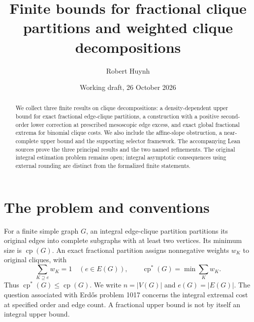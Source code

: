 \documentclass[11pt]{article}
\title{Finite bounds for fractional clique partitions and weighted clique decompositions}
\author{Robert Huynh}
\date{Working draft, 26 October 2026}
\newcommand{\cp}{\operatorname{cp}}
\begin{document}
\maketitle
\begin{abstract}
We collect three finite results on clique decompositions: a density-dependent upper bound for exact fractional edge-clique partitions, a construction with a positive second-order lower correction at prescribed mesoscopic edge excess, and exact global fractional extrema for binomial clique costs. We also include the affine-slope obstruction, a near-complete upper bound and the supporting selector framework. The accompanying Lean sources prove the three principal results and the two named refinements. The original integral estimation problem remains open; integral asymptotic consequences using external rounding are distinct from the formalized finite statements.
\end{abstract}
\tableofcontents

\section{The problem and conventions}
For a finite simple graph $G$, an integral edge-clique partition partitions its original edges into complete subgraphs with at least two vertices. Its minimum size is $\cp(G)$. An exact fractional partition assigns nonnegative weights $w_K$ to original cliques, with
\[
 \sum_{K\supseteq e} w_K=1\quad(e\in E(G)),\qquad
 \cp^*(G)=\min\sum_K w_K.
\]
Thus $\cp^*(G)\leq\cp(G)$. We write $n=|V(G)|$ and $e(G)=|E(G)|$. The question associated with Erd\H{o}s problem 1017 concerns the integral extremal cost at specified order and edge count. A fractional upper bound is not by itself an integral upper bound.
\end{document}
